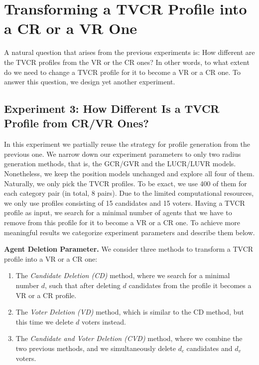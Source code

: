 \section{Transforming a TVCR Profile into a CR or a VR One}
A natural question that arises from the previous experiments is:
How different are the TVCR profiles from the VR or the CR ones? 
In other words, to what extent do we need to change a TVCR profile for it to become a VR or a CR one. 
To answer this question, we design yet another experiment.

\subsection{Experiment 3: How Different Is a TVCR Profile from CR/VR Ones?}

In this experiment we partially reuse the strategy for profile generation from the previous one.
We narrow down our experiment parameters to only two radius generation methods,
that is, the GCR/GVR and the LUCR/LUVR models.
Nonetheless, we keep the position models unchanged and explore all four of them.
Naturally, we only pick the TVCR profiles. To be exact, we use 400 of them for each category pair (in total, 8 pairs).
Due to the limited computational resources, we only use profiles consisting of 15 candidates and 15 voters.
Having a TVCR profile as input, we search for a minimal number of agents that we have to remove from this profile
for it to become a VR or a CR one. To achieve more meaningful results we categorize experiment parameters and describe them below.
\newline

\noindent \textbf{Agent Deletion Parameter.} \indent We consider three methods to transform a TVCR profile into a VR or a CR one:
\begin{enumerate}
    \item The \textit{Candidate Deletion (CD)} method, 
    where we search for a minimal number $d$,
    such that after deleting $d$ candidates from the profile it becomes a VR or a CR profile.

    \item The \textit{Voter Deletion (VD)} method, 
    which is similar to the CD method, but this time we delete $d$ voters instead.

    \item The \textit{Candidate and Voter Deletion (CVD)} method, 
    where we combine the two previous methods, and we simultaneously delete $d_c$ candidates and $d_v$ voters.
\end{enumerate}

